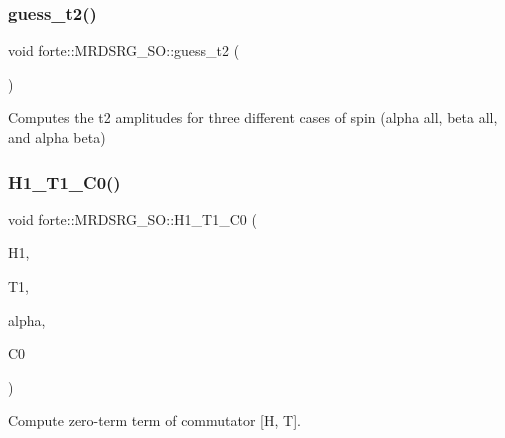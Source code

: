 \subsubsection{\texorpdfstring{guess\+\_\+t2()}{guess\_t2()}}
{\footnotesize\ttfamily void forte\+::\+M\+R\+D\+S\+R\+G\+\_\+\+S\+O\+::guess\+\_\+t2 (\begin{DoxyParamCaption}{ }\end{DoxyParamCaption})\hspace{0.3cm}{\ttfamily [protected]}}

Computes the t2 amplitudes for three different cases of spin (alpha all, beta all, and alpha beta) \mbox{\label{classforte_1_1_m_r_d_s_r_g___s_o_aa4920316bbe47fe37ca3f282490a4e5c}} 
\subsubsection{\texorpdfstring{H1\+\_\+\+T1\+\_\+\+C0()}{H1\_T1\_C0()}}
{\footnotesize\ttfamily void forte\+::\+M\+R\+D\+S\+R\+G\+\_\+\+S\+O\+::\+H1\+\_\+\+T1\+\_\+\+C0 (\begin{DoxyParamCaption}\item[{Blocked\+Tensor \&}]{H1,  }\item[{Blocked\+Tensor \&}]{T1,  }\item[{const double \&}]{alpha,  }\item[{double \&}]{C0 }\end{DoxyParamCaption})\hspace{0.3cm}{\ttfamily [protected]}}



Compute zero-\/term term of commutator \mbox{[}H, T\mbox{]}. 

\mbox{\label{classforte_1_1_m_r_d_s_r_g___s_o_a2a362b81e0b31d030eecbe5f20a4e353}} 
